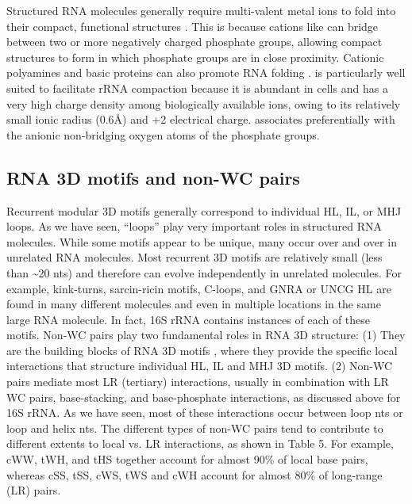 Structured RNA molecules generally require multi-valent metal ions to fold into
their compact, functional structures \cite{Woodson2005, Bowman2012, Draper2005,
Draper2013, Auffinger2011, Tan2011}. This is because cations like  can
bridge between two or more negatively charged phosphate groups, allowing compact
structures to form in which phosphate groups are in close proximity. Cationic
polyamines and basic proteins can also promote RNA folding \cite{Klein2004a,
Koculi2006}.  is particularly well suited to facilitate rRNA compaction
because it is abundant in cells and has a very high charge density among
biologically available ions, owing to its relatively small ionic radius (0.6\AA)
and +2 electrical charge.  associates preferentially with the anionic
non-bridging oxygen atoms of the phosphate groups. 

\subsection{RNA 3D motifs and non-WC pairs}

Recurrent modular 3D motifs generally correspond to individual HL, IL, or MHJ
loops. As we have seen, ``loops'' play very important roles in structured RNA
molecules. While some motifs appear to be unique, many occur over and over in
unrelated RNA molecules. Most recurrent 3D motifs are relatively small (less
than \textasciitilde 20 nts) and therefore can evolve independently in unrelated molecules.
For example, kink-turns, sarcin-ricin motifs, C-loops, and GNRA or UNCG HL are
found in many different molecules and even in multiple locations in the same
large RNA molecule. In fact, 16S rRNA contains instances of each of these
motifs. Non-WC pairs play two fundamental roles in RNA 3D structure: (1) They
are the building blocks of RNA 3D motifs \cite{Leontis2006}, where they provide
the specific local interactions that structure individual HL, IL and MHJ 3D
motifs. (2) Non-WC pairs mediate most LR (tertiary) interactions, usually in
combination with LR WC pairs, base-stacking, and base-phosphate interactions, as
discussed above for 16S rRNA. As we have seen, most of these interactions occur
between loop nts or loop and helix nts. The different types of non-WC pairs tend
to contribute to different extents to local vs. LR interactions, as shown in
Table 5. For example, cWW, tWH, and tHS together account for almost 90\% of
local base pairs, whereas cSS, tSS, cWS, tWS and cWH account for almost 80\% of
long-range (LR) pairs. 


